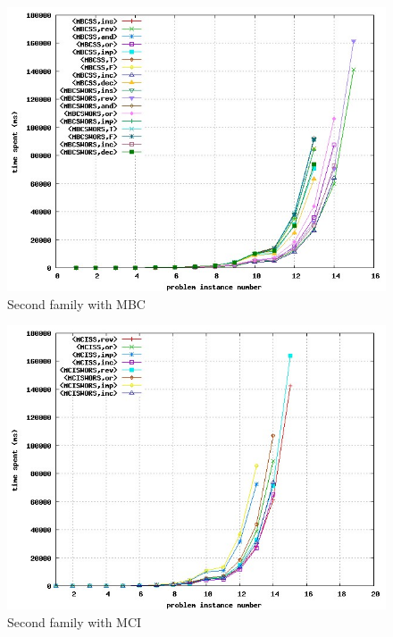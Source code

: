 \documentclass[a4paper,10pt]{book}
\begin{document}
 
\begin{figure}[h!]
\begin{center}
\includegraphics[width=.9\textwidth]{MBC_2_C.jpg}
\end{center}
\caption{Second family with MBC}
\end{figure}


\begin{figure}[h!]
\begin{center}
\includegraphics[width=.9\textwidth]{MCI_2_C.jpg}
\end{center}
\caption{Second family with MCI}
\end{figure}
\end{document}
